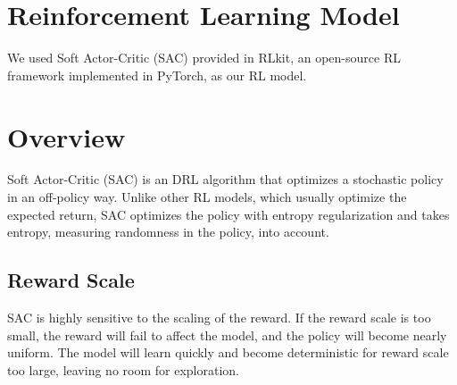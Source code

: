 \section{Reinforcement Learning Model}
We used Soft Actor-Critic (SAC) \cite{haarnoja2018soft} provided in RLkit, an open-source RL framework implemented in PyTorch\cite{pongrlkit}, as our RL model.
\par
\section{Overview}
Soft Actor-Critic (SAC) is an DRL algorithm that optimizes a stochastic policy in an off-policy way.
Unlike other RL models, which usually optimize the expected return, SAC optimizes the policy with entropy regularization and takes entropy, measuring randomness in the policy, into account.
\par
\subsection{Reward Scale}
SAC is highly sensitive to the scaling of the reward. If the reward scale is too small, the reward will fail to affect the model, and the policy will become nearly uniform. The model will learn quickly and become deterministic for reward scale too large, leaving no room for exploration.
\\
\\
\\
\\
\\